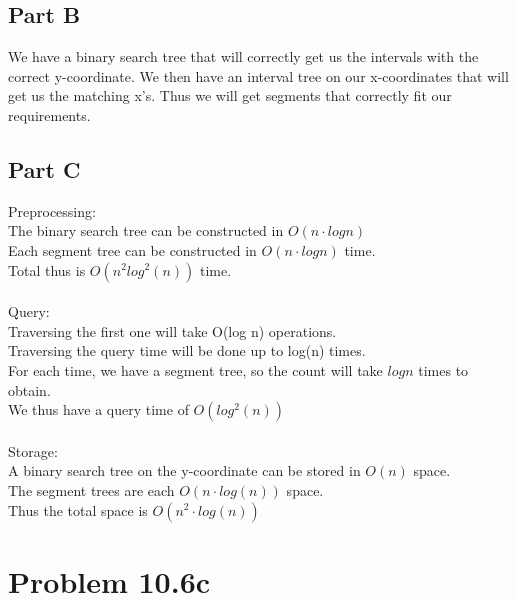 \documentclass[11pt,psfig]{article}
\begin{document}
\subsection*{Part B}

We have a binary search tree that will correctly get us the intervals with the correct y-coordinate. We then have an interval tree on our x-coordinates that will get us the matching x's. Thus we will get segments that correctly fit our requirements. \\

\subsection*{Part C}

Preprocessing: \\
The binary search tree can be constructed in $O(n \cdot logn)$\\
Each segment tree can be constructed in $O(n \cdot logn)$ time. \\
Total thus is $O(n^2 log^2(n))$ time. \\
\\
Query: \\
Traversing the first one will take O(log n) operations. \\
Traversing the query time will be done up to log(n) times.\\
For each time, we have a segment tree, so the count will take $log n$ times to obtain. \\
We thus have a query time of $O(log^2(n))$\\
\\
Storage:\\
A binary search tree on the y-coordinate can be stored in $O(n)$ space. \\
The segment trees are each $O(n \cdot log(n))$ space. \\
Thus the total space is $O(n^2 \cdot log(n))$


\section*{Problem 10.6c}
\end{document}
